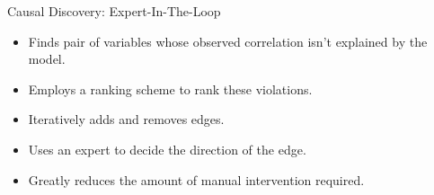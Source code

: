 \documentclass[aspectratio=169]{beamer}
\begin{document}
\begin{frame}{Causal Discovery: Expert-In-The-Loop}

	\vspace{2em}

	\begin{itemize}
		\item Finds pair of variables whose observed correlation isn't explained by the model.
		\item Employs a ranking scheme to rank these violations.
		\item Iteratively adds and removes edges.
		\item Uses an expert to decide the direction of the edge.
		\item Greatly reduces the amount of manual intervention required.
	\end{itemize}
\end{frame}
\end{document}
